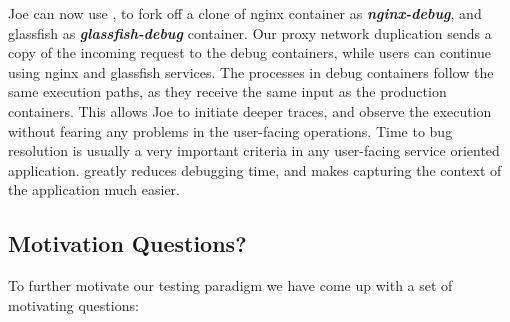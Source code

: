 Joe can now use \parikshan, to fork off a clone of nginx container as \textbf{\textit{nginx-debug}}, and glassfish as \textbf{\textit{glassfish-debug}} container. 
Our proxy network duplication sends a copy of the incoming request to the debug containers, while users can continue using nginx and glassfish services. 
The processes in debug containers follow the same execution paths, as they receive the same input as the production containers.
This allows Joe to initiate deeper traces, and observe the execution without fearing any problems in the user-facing operations.
Time to bug resolution is usually a very important criteria in any user-facing service oriented application.
\parikshan greatly reduces debugging time, and makes capturing the context of the application much easier.


\iffalse
\subsection{Motivation Questions?}

To further motivate our testing paradigm we have come up with a set of motivating questions:


